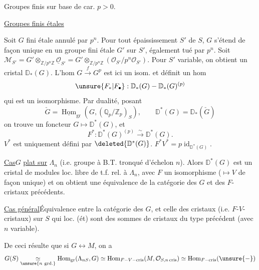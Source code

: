 Groupes finis sur base de car. $p>0$.

\uline{Groupes finis étales}

Soit $G$ fini étale annulé par $p^n$. Pour tout épaississement
$S'$ de $S$, $G$ s'étend de façon unique en un groupe fini étale
$G'$ sur $S'$, également tué par $p^n$. Soit
$\mathcal M_{S'}=G'\otimes_{\mathbb Z/p^n\mathbb Z}
\underline{\mathcal O}_{S'}
=G'\otimes_{\mathbb Z/p^n\mathbb Z}
(\mathcal O_{S'}/p^n\mathcal O_{S'})$.
Pour $S'$ variable, on obtient un cristal $\mathbb D_*(G)$.
L'hom $G\xrightarrow{f}G^p$ est ici un isom. et définit un hom
\[
\unsure{F_*|F_\bullet}:\mathbb D_*(G)-\mathbb D_*(G)^{(p)}
\]
qui est un isomorphisme. Par dualité, posant
\[
\check G=\underline{\operatorname{Hom}}_{\mathrm{gr}}
(G,(\mathbb Q_p/\mathbb Z_p)_S),\qquad
\mathbb D^*(G)=\mathbb D_*(\check G)
\]
on trouve un foncteur $G\longmapsto\mathbb D^*(G)$,
et
\[
F^*:\mathbb D^*(G)^{(p)}\xrightarrow{\sim}\mathbb D^*(G).
\]
$V^*$ est uniquement défini par $\deleted{\mathbb D^*(G)}$.
$F^*V^*=p\operatorname{id}_{\mathbb D^*(G)}$.


\uline{Cas}\quad $G$ \uline{plat sur} $\Lambda_n$
(i.e. groupe à B.T. tronqué d'échelon $n$).
Alors $\mathbb D^*(G)$ est un cristal de modules loc. libre de t.f.
rel. à $\Lambda_n$, \unsure{\&} avec $F$ 
un isomorphisme ($\mapsto V$ de façon unique) et on obtient une
équivalence de la catégorie des
 $G$ et des $F$-cristaux précédents.

\uline{Cas général}\quad {}Équivalence entre la catégorie
des $G$, et celle des cristaux
(i.e. $F$-$V$-cristaux) sur $S$ qui loc. (ét) sont des sommes de
cristaux du type précédent (avec $n$ variable).

De ceci résulte que si $G\longleftrightarrow M$, on a
\[
G(S)\underset{\unsure{n\ \mathrm{grd.}}}{\simeq}
\operatorname{Hom}_{\mathrm{gr}}(\Lambda_{nS},G)
\simeq\operatorname{Hom}_{F-V-\mathrm{cris}}
(M,\mathcal O_{S,n\,\mathrm{cris}})
\simeq\operatorname{Hom}_{F-\mathrm{cris}}(\unsure{-})
\]
